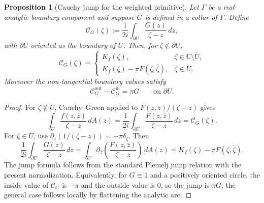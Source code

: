 \documentclass[11pt]{article}
\newtheorem{proposition}[theorem]{Proposition}
\newcommand{\C}{\mathbb C}
\newcommand{\dd}{\,d}
\newcommand{\1}{\mathbf 1}
\begin{document}
\begin{proposition}[Cauchy jump for the weighted primitive]\label{prop:cauchy-jump-G}
Let \(\Gamma\) be a real-analytic boundary component and suppose \(G\) is defined in a
collar of \(\Gamma\). Define
\[
  \mathcal C_G(\zeta):=\frac{1}{2i}\int_{\partial U}\frac{G(z)}{\zeta-z}\dd z,
\]
with \(\partial U\) oriented as the boundary of \(U\). Then, for \(\zeta\notin\partial U\),
\begin{equation}\label{eq:C-G-out-in}
  \mathcal C_G(\zeta)=
  \begin{cases}
  K_f(\zeta), & \zeta\in \C\setminus\overline U,\\[0.4em]
  K_f(\zeta)-\pi F(\zeta,\bar\zeta), & \zeta\in U.
  \end{cases}
\end{equation}
Moreover the non-tangential boundary values satisfy
\begin{equation}\label{eq:C-G-jump}
  \mathcal C_G^{\mathrm{out}}-\mathcal C_G^{\mathrm{in}}=\pi G
  \qquad\text{on }\partial U.
\end{equation}
\end{proposition}

\begin{proof}
For \(\zeta\notin\overline U\), Cauchy--Green applied to
\(F(z,\bar z)/(\zeta-z)\) gives
\[
  \int_U \frac{f(z,\bar z)}{\zeta-z}\dd A(z)
  =
  \frac{1}{2i}\int_{\partial U}\frac{F(z,\bar z)}{\zeta-z}\dd z
  =
  \mathcal C_G(\zeta).
\]
For \(\zeta\in U\), use
\(\partial_{\bar z}(1/(\zeta-z))=-\pi\delta_\zeta\). Then
\[
  \frac{1}{2i}\int_{\partial U}\frac{G(z)}{\zeta-z}\dd z
  =
  \int_U \partial_{\bar z}\left(\frac{F(z,\bar z)}{\zeta-z}\right)\dd A(z)
  =
  K_f(\zeta)-\pi F(\zeta,\bar\zeta).
\]
The jump formula follows from the standard Plemelj jump relation with the present
normalization. Equivalently, for \(G\equiv1\) and a positively oriented circle, the inside
value of \(\mathcal C_G\) is \(-\pi\) and the outside value is \(0\), so the jump is
\(\pi G\); the general case follows locally by flattening the analytic arc.
\end{proof}
\end{document}
